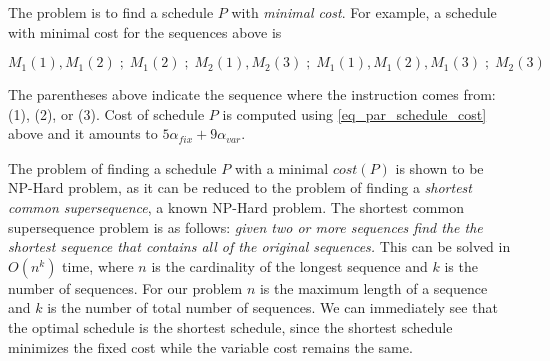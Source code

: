 



The problem is to find a schedule $P$ with \emph{minimal cost}. For example, a schedule with minimal cost for the sequences above is 

$$ 
M_1(1), M_1(2) \; ;\; M_1(2) \; ; \; M_2(1), M_2(3) \; ; \; M_1(1), M_1(2), M_1(3) \; ; \;  M_2(3)
$$

The parentheses above indicate the sequence where the instruction comes from: (1), (2), or (3). 
Cost of schedule $P$ is computed using \cref{eq_par_schedule_cost} above and it amounts to $5\alpha_\mathit{fix} + 9\alpha_\mathit{var}$.

The problem of finding a schedule $P$ with a minimal $cost(P)$ is shown to be NP-Hard problem, as it can be reduced to the problem of finding a \emph{shortest common supersequence}, a known NP-Hard problem\cite{Maier1978, Vazirani2010}. The shortest common supersequence problem is as follows: {\it given two or more sequences find the the shortest sequence that contains all of the original sequences.} This can be solved in $O(n^k)$ time, where $n$ is the cardinality of the longest sequence and $k$ is the number of sequences. For our problem $n$ is the maximum length of a sequence and $k$ is the number of total number of sequences. We can immediately see that the optimal schedule is the shortest schedule, since the shortest schedule minimizes the fixed cost while the variable cost remains the same.

